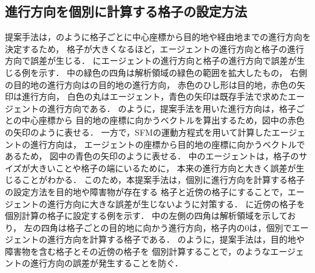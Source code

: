 \subsection{進行方向を個別に計算する格子の設定方法}
提案手法は，のように格子ごとに中心座標から目的地や経由地までの進行方向を決定するため，
格子が大きくなるほど，エージェントの進行方向と格子の進行方向で誤差が生じる．
にエージェントの進行方向と格子の進行方向で誤差が生じる例を示す．
中の緑色の四角は解析領域の緑色の範囲を拡大したもの，
右側の目的地の進行方向はの目的地の進行方向，
赤色のひし形は目的地，赤色の矢印は進行方向，
白色の丸はエージェント，青色の矢印は既存手法で求めたエージェントの進行方向である．
のように，提案手法を用いた進行方向は，格子ごとの中心座標から
目的地の座標に向かうベクトルを算出するため，図中の赤色の矢印のように表せる．
一方で，SFMの運動方程式を用いて計算したエージェントの進行方向は，
エージェントの座標から目的地の座標に向かうベクトルであるため，
図中の青色の矢印のように表せる．
中のエージェントは，格子のサイズが大きいことや格子の端にいるために，
本来の進行方向と大きく誤差が生じることがわかる．
このため，本提案手法は，個別に進行方向を計算する格子の設定方法を目的地や障害物が存在する
格子と近傍の格子にすることで，エージェントの進行方向に大きな誤差が生じないように対策する．
に近傍の格子を個別計算の格子に設定する例を示す．
中の左側の四角は解析領域を示しており，
左の四角は格子ごとの目的地に向かう進行方向，格子内の0は，個別でエージェントの進行方向を計算する格子である．
のように，提案手法は，目的地や障害物を含む格子とその近傍の格子を
個別計算することで，のようなエージェントの進行方向の誤差が発生することを防ぐ．





\clearpage
